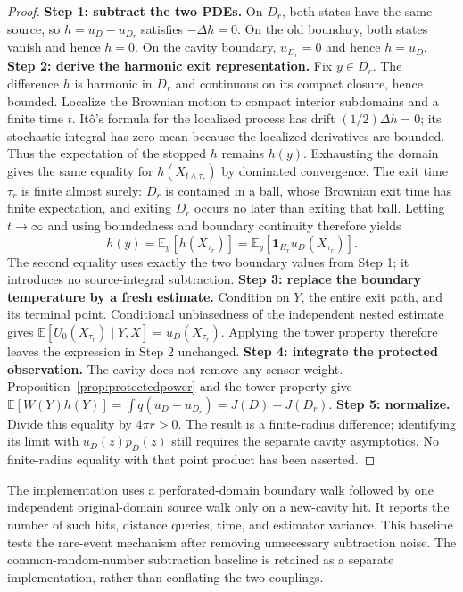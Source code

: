 \begin{proof}
\textbf{Step 1: subtract the two PDEs.}
On $D_r$, both states have the same source, so $h=u_D-u_{D_r}$ satisfies
$-\Delta h=0$. On the old boundary, both states vanish and hence $h=0$.
On the cavity boundary, $u_{D_r}=0$ and hence $h=u_D$.
\textbf{Step 2: derive the harmonic exit representation.}
Fix $y\in D_r$. The difference $h$ is harmonic in $D_r$ and continuous on its
compact closure, hence bounded. Localize the Brownian motion to compact
interior subdomains and a finite time $t$. It\^o's formula for the localized
process has drift $(1/2)\Delta h=0$; its stochastic integral has zero mean
because the localized derivatives are bounded. Thus the expectation of the
stopped $h$ remains $h(y)$. Exhausting the domain gives the same equality
for $h(X_{t\wedge\tau_r})$ by dominated convergence. The exit time $\tau_r$
is finite almost surely: $D_r$ is contained in a ball, whose Brownian exit
time has finite expectation, and exiting $D_r$ occurs no later than exiting
that ball. Letting $t\to\infty$ and using boundedness and boundary continuity
therefore yields
\[
 h(y)=\mathbb E_y[h(X_{\tau_r})]
     =\mathbb E_y[\mathbf1_{H_r}u_D(X_{\tau_r})].
\]
The second equality uses exactly the two boundary values from Step 1;
it introduces no source-integral subtraction.
\textbf{Step 3: replace the boundary temperature by a fresh estimate.}
Condition on $Y$, the entire exit path, and its terminal point. Conditional
unbiasedness of the independent nested estimate gives
$\mathbb E[U_0(X_{\tau_r})\mid Y,X]=u_D(X_{\tau_r})$.
Applying the tower property therefore leaves the expression in Step 2 unchanged.
\textbf{Step 4: integrate the protected observation.}
The cavity does not remove any sensor weight. Proposition~\ref{prop:protectedpower}
and the tower property give
$\mathbb E[W(Y)h(Y)]=\int q(u_D-u_{D_r})=J(D)-J(D_r)$.
\textbf{Step 5: normalize.}
Divide this equality by $4\pi r>0$. The result is a finite-radius difference;
identifying its limit with $u_D(z)p_D(z)$ still requires the separate cavity
asymptotics. No finite-radius equality with that point product has been asserted.
\end{proof}

The implementation uses a perforated-domain boundary walk followed by one
independent original-domain source walk only on a new-cavity hit. It reports
the number of such hits, distance queries, time, and estimator variance. This
baseline tests the rare-event mechanism after removing unnecessary subtraction
noise. The common-random-number subtraction baseline is retained as a separate
implementation, rather than conflating the two couplings.

